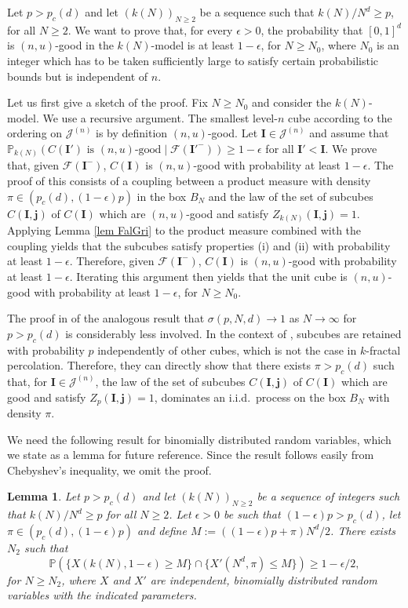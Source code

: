 \documentclass[11pt,a4paper]{article}
\newcommand{\Ib}{\ensuremath{\mathbf{I}}}
\newcommand{\Ij}{\ensuremath{\mathbf{j}}}
\newcommand{\pc}{\ensuremath{p_{c}(d)}}
\newcommand{\IP}{\ensuremath{\mathbb{P}}}
\newcommand{\JJ}{\ensuremath{\mathcal{J}}}
\newcommand{\FF}{\ensuremath{\mathcal{F}}}
\newtheorem{lemma}[theorem]{Lemma}
\theoremstyle{remark}
\begin{document}
Let $p>\pc$ and let $(k(N))_{N \geq 2}$ be a sequence such that $k(N)/N^d \geq p$, for all $N \geq 2$. We want to prove that, for every $\epsilon>0$, the probability that $[0,1]^d$ is $(n,u)$-good in the $k(N)$-model is at least $1-\epsilon$, 
for $N \geq N_0$, where $N_0$ is an integer which has to be taken sufficiently large to satisfy certain probabilistic bounds but is independent of $n$.


Let us first give a sketch of the proof. Fix $N\geq N_0$ and consider the $k(N)$-model. We use a recursive argument. The smallest level-$n$ cube according to the ordering on $\JJ^{(n)}$ is by definition $(n,u)$-good. Let $\Ib \in \JJ^{(n)}$ and assume that $\IP_{k(N)}(C(\Ib') \text{ is } (n,u)\text{-good} \mid \FF(\Ib'^-)) \geq 1-\epsilon$ for all $\Ib'<\Ib$. We prove that, given $\FF(\Ib^-)$, $C(\Ib)$ is $(n,u)$-good with probability at least $1-\epsilon$. The proof of this consists of a coupling between a product measure with density $\pi \in (\pc,(1-\epsilon)p)$ in the box $B_N$ and the law of the set of subcubes $C(\Ib,\Ij)$ of $C(\Ib)$ which are $(n,u)$-good and satisfy $Z_{k(N)}(\Ib,\Ij) = 1$. Applying Lemma \ref{lem FalGri} to the product measure combined with the coupling yields that the subcubes satisfy properties (i) and (ii) with probability at least $1-\epsilon$. Therefore, given $\FF(\Ib^-)$, $C(\Ib)$ is $(n,u)$-good with probability at least $1-\epsilon$. Iterating this argument then yields that the unit cube is $(n,u)$-good with probability at least $1-\epsilon$, for $N \geq N_0$.


The proof in \cite{FalGri} of the analogous result that $\sigma(p,N,d) \to 1$ as $N \to \infty$ for $p> \pc$ is considerably less involved. In the context of \cite{FalGri}, subcubes are retained with probability $p$ independently of other cubes, which is not the case in $k$-fractal percolation. Therefore, they can directly show that there exists $\pi>\pc$ such that, for $\Ib \in \JJ^{(n)}$, the law of the set of subcubes $C(\Ib,\Ij)$ of $C(\Ib)$ which are good and satisfy $Z_p(\Ib,\Ij) = 1$, dominates an i.i.d.\ process on the box $B_N$ with density $\pi$.


We need the following result for binomially distributed random variables, which we state as a lemma for future reference. Since the result follows easily from Chebyshev's inequality, we omit the proof.


\begin{lemma}\label{lem good3}
Let $p > \pc$ and let $(k(N))_{N \geq 2}$ be a sequence of integers such that $k(N)/N^d \geq p$ for all  $N \geq 2$. Let $\epsilon>0$ be such that $(1-\epsilon) p > \pc$, let $\pi \in (\pc, (1-\epsilon) p)$ and define $M:= ((1-\epsilon)p+\pi)N^d / 2$. There exists $N_2$ such that 
\[
\IP(\{X(k(N),1-\epsilon) \geq M\} \cap \{X'(N^{d},\pi) \leq M\}) \geq 1-\epsilon/2,
\]
for $N \geq N_2$, where $X$ and $X'$ are independent, binomially distributed random variables with the indicated parameters.
\end{lemma}
\end{document}
